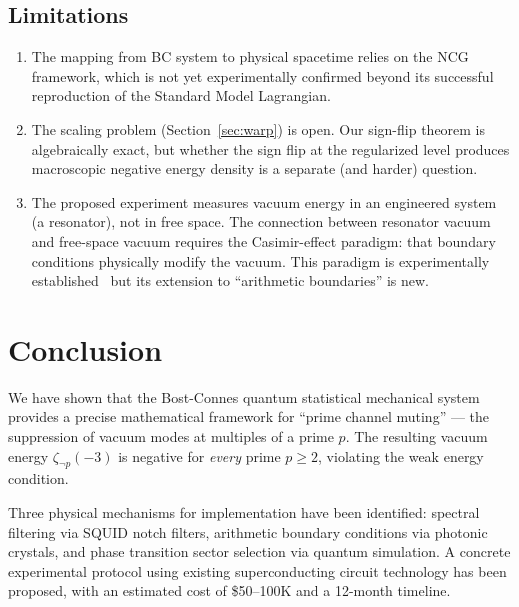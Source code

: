 \documentclass[aps,prd,twocolumn,superscriptaddress,nofootinbib]{revtex4-2}
\begin{document}
\subsection{Limitations}

\begin{enumerate}
  \item The mapping from BC system to physical spacetime
    relies on the NCG framework, which is not yet experimentally
    confirmed beyond its successful reproduction of the
    Standard Model Lagrangian.
  \item The scaling problem (Section~\ref{sec:warp}) is open.
    Our sign-flip theorem is algebraically exact, but whether
    the sign flip at the regularized level produces macroscopic
    negative energy density is a separate (and harder) question.
  \item The proposed experiment measures vacuum energy in an
    engineered system (a resonator), not in free space.
    The connection between resonator vacuum and free-space
    vacuum requires the Casimir-effect paradigm: that
    boundary conditions physically modify the vacuum.
    This paradigm is experimentally established~\cite{Casimir1948,Lamoreaux1997}
    but its extension to ``arithmetic boundaries'' is new.
\end{enumerate}

\section{Conclusion}
\label{sec:conclusion}

We have shown that the Bost-Connes quantum statistical mechanical
system provides a precise mathematical framework for ``prime channel
muting'' --- the suppression of vacuum modes at multiples of a prime $p$.
The resulting vacuum energy $\zeta_{\neg p}(-3)$ is negative for
\emph{every} prime $p \geq 2$, violating the weak energy condition.

Three physical mechanisms for implementation have been identified:
spectral filtering via SQUID notch filters, arithmetic boundary
conditions via photonic crystals, and phase transition sector
selection via quantum simulation. A concrete experimental
protocol using existing superconducting circuit technology
has been proposed, with an estimated cost of \$50--100K and
a 12-month timeline.
\end{document}

